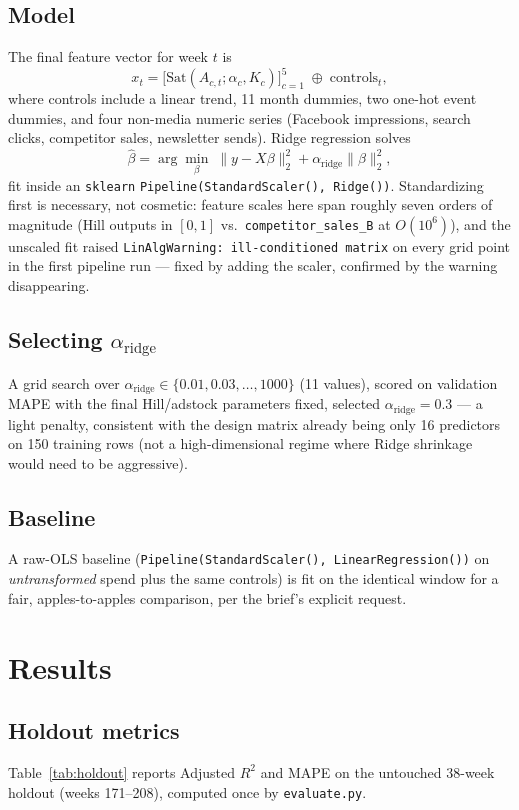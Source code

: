 \documentclass[11pt]{report}
\begin{document}
\section{Model}
The final feature vector for week $t$ is
\[
  x_t = \big[\text{Sat}(A_{c,t}; \alpha_c, K_c)\big]_{c=1}^{5} \; \oplus \; \text{controls}_t,
\]
where controls include a linear trend, 11 month dummies, two one-hot event dummies, and
four non-media numeric series (Facebook impressions, search clicks, competitor sales,
newsletter sends). Ridge regression solves
\[
  \hat\beta = \arg\min_\beta \; \|y - X\beta\|_2^2 + \alpha_{\text{ridge}} \|\beta\|_2^2,
\]
fit inside an \texttt{sklearn} \texttt{Pipeline(StandardScaler(), Ridge())}. Standardizing
first is necessary, not cosmetic: feature scales here span roughly seven orders of
magnitude (Hill outputs in $[0,1]$ vs.\ \texttt{competitor\_sales\_B} at $O(10^6)$), and
the unscaled fit raised \texttt{LinAlgWarning: ill-conditioned matrix} on every grid
point in the first pipeline run --- fixed by adding the scaler, confirmed by the warning
disappearing.

\section{Selecting $\alpha_{\text{ridge}}$}
A grid search over $\alpha_{\text{ridge}} \in \{0.01, 0.03, \dots, 1000\}$ (11 values),
scored on validation MAPE with the final Hill/adstock parameters fixed, selected
$\alpha_{\text{ridge}} = 0.3$ --- a light penalty, consistent with the design matrix
already being only 16 predictors on 150 training rows (not a high-dimensional regime
where Ridge shrinkage would need to be aggressive).

\section{Baseline}
A raw-OLS baseline (\texttt{Pipeline(StandardScaler(), LinearRegression())} on
\emph{untransformed} spend plus the same controls) is fit on the identical window for a
fair, apples-to-apples comparison, per the brief's explicit request.

\chapter{Results}
\label{ch:results}

\section{Holdout metrics}
Table~\ref{tab:holdout} reports Adjusted $R^2$ and MAPE on the untouched 38-week holdout
(weeks 171--208), computed once by \texttt{evaluate.py}.
\end{document}
